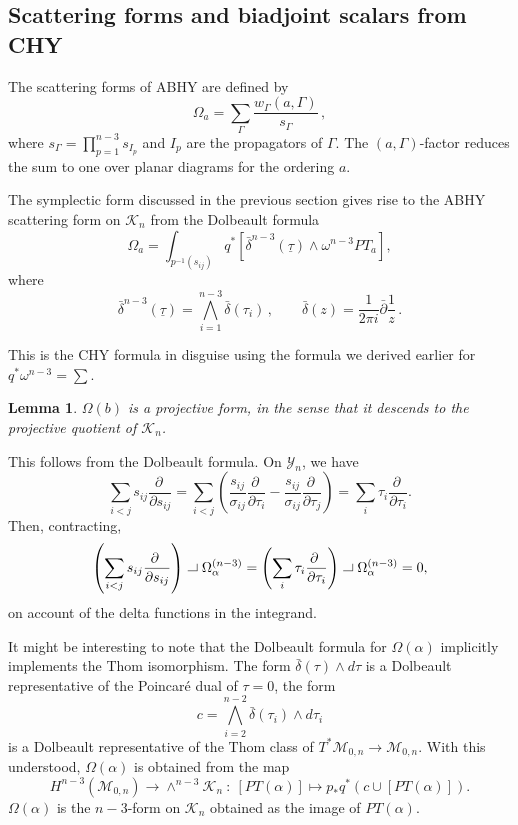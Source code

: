 \documentclass[11pt]{article}
\newcommand{\p}{\partial}
\newcommand{\cK}{\mathcal{K}}
\newcommand{\cM}{\mathcal{M}}
\newcommand{\cY}{\mathcal{Y}}
\newcommand{\bt}{\underline{\tau}}
\newcommand{\1}{{\rm 1\hskip-0.25em I}}
\newcommand{\proof}{ \noindent {\bf Proof:} }
\newtheorem{lemma}{Lemma}[section]
\newcommand{\hook}{{\setlength{\unitlength}{10pt}		%
                  ~ \begin{picture}(.833,.8)
                   \put(-.18,.08){\line(1,0){.7}}
                   \put(.5,.08){\line(0,1){.5}}
                   \end{picture}}}
\begin{document}
 



\subsection{Scattering forms and  biadjoint scalars from CHY}


The scattering forms of ABHY are defined by 
\begin{equation}
\Omega_a=\sum_{\Gamma}\frac{w_\Gamma  (a,\Gamma)}{s_\Gamma} \, ,
\end{equation}
where $s_\Gamma=\prod_{p=1}^{n-3} s_{I_p}$ and  $I_p$ are the propagators of $\Gamma$. The $(a,\Gamma)$-factor reduces the sum to one  over planar diagrams for the ordering $a$.



The symplectic form discussed in the previous section gives rise to the ABHY scattering form on $\cK_n$ from the Dolbeault formula 
\begin{equation}
\Omega_a = \int_{p^{-1}(s_{ij})} q^* \left[ \bar\delta^{n-3}(\bt) \wedge \omega^{n-3} PT_a \right],
\end{equation}
where 
\begin{equation}
\bar\delta^{n-3}(\bt)=\bigwedge_{i=1}^{n-3} \bar\delta(\tau_i)\, , \qquad \bar \delta(z)=\frac{1}{2\pi i} \bar\p\frac{1}{z}\, .
\end{equation} 


This is the CHY formula in disguise using the formula we derived earlier for $q^*\omega^{n-3}=\sum$.

\begin{lemma}
 $\Omega(b)$ is a projective form, in the sense that it descends to the projective quotient of $\cK_n$.
 \end{lemma}
 \proof This follows from the Dolbeault formula. On $\cY_n$, we have
$$
\sum_{i<j}s_{ij}\frac{\p~}{\p s_{ij}} = \sum_{i<j} \left(\frac{s_{ij}}{\sigma_{ij}}\frac{\p~}{\p\tau_i} - \frac{s_{ij}}{\sigma_{ij}}\frac{\p~}{\p\tau_j}\right) = \sum_i \tau_i \frac{\p~}{\p\tau_i}.
$$
Then, contracting,
$$
\left(\sum_{i<j}s_{ij}\frac{\p~}{\p s_{ij}}\right)\hook \Omega_{\alpha}^{(n-3)} = \left(\sum_i \tau_i \frac{\p~}{\p\tau_i}\right)\hook \Omega_{\alpha}^{(n-3)} = 0,
$$
on account of the delta functions in the integrand.

It might be interesting to note that the Dolbeault formula for $\Omega(\alpha)$ implicitly implements the Thom isomorphism. The form $\bar\delta(\tau)\wedge d\tau$ is a Dolbeault representative of the Poincar\'e dual of $\tau = 0$, the form
$$
c = \bigwedge_{i=2}^{n-2} \bar\delta(\tau_i) \wedge d\tau_i
$$
is a Dolbeault representative of the Thom class of $T^*\cM_{0,n}\rightarrow \cM_{0,n}$. With this understood, $\Omega(\alpha)$ is obtained from the map
$$
H^{n-3}(\cM_{0,n}) \rightarrow \wedge^{n-3}\cK_n ~:~ [PT(\alpha)] \mapsto p_* q^* \left(c \cup [PT(\alpha)]\right).
$$
$\Omega(\alpha)$ is the $n-3$-form on $\cK_n$ obtained as the image of $PT(\alpha)$.
\end{document}
